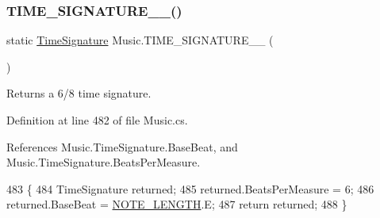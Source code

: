 \subsubsection{\texorpdfstring{T\+I\+M\+E\+\_\+\+S\+I\+G\+N\+A\+T\+U\+R\+E\+\_\+\_()}{TIME\_SIGNATURE\_6\_8()}}
{\footnotesize\ttfamily static \hyperlink{group___music_structs_struct_music_1_1_time_signature}{Time\+Signature} Music.\+T\+I\+M\+E\+\_\+\+S\+I\+G\+N\+A\+T\+U\+R\+E\+\_\+\_ (\begin{DoxyParamCaption}{ }\end{DoxyParamCaption})\hspace{0.3cm}{\ttfamily [static]}}



Returns a 6/8 time signature. 



Definition at line 482 of file Music.\+cs.



References Music.\+Time\+Signature.\+Base\+Beat, and Music.\+Time\+Signature.\+Beats\+Per\+Measure.


\begin{DoxyCode}
483     \{
484         TimeSignature returned;
485         returned.BeatsPerMeasure = 6;
486         returned.BaseBeat = \hyperlink{group___music_enums_gaf11b5f079adbb21c800b9eca1c5c3cbd}{NOTE\_LENGTH}.E;
487         \textcolor{keywordflow}{return} returned;
488     \}
\end{DoxyCode}
